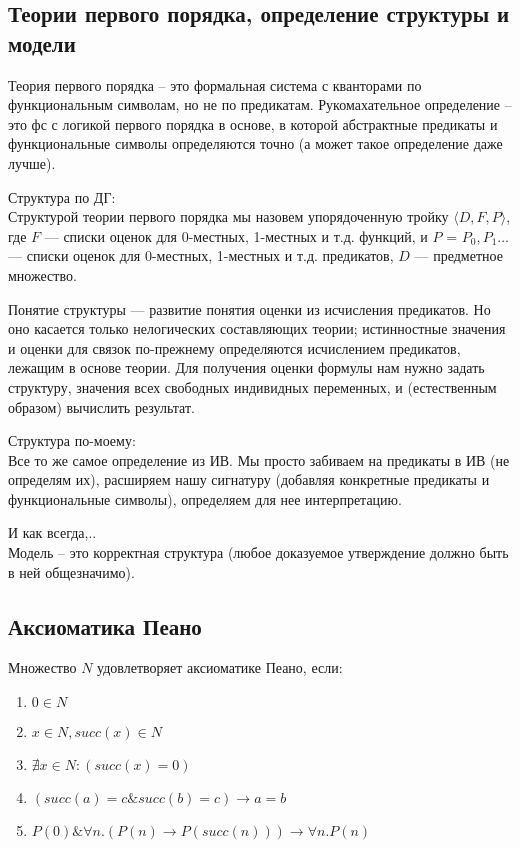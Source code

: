 \subsection{Теории первого порядка, определение структуры и модели}
\label{sec-2-18}
Теория первого порядка -- это формальная система с кванторами по
функциональным символам, но не по предикатам. Рукомахательное
определение – это фс с логикой первого порядка в основе, в которой
абстрактные предикаты и функциональные символы определяются точно
(а может такое определение даже лучше).

Структура по ДГ:\\
Структурой теории первого порядка мы назовем упорядоченную тройку
$\langle D, F, P\rangle$, где $F$ — списки оценок для 0-местных, 1-местных и т.д.
функций, и $P$ = $P_{0}, P_{1} \ldots$ — списки оценок для 0-местных,
1-местных и т.д. предикатов, $D$ — предметное множество.

Понятие структуры — развитие понятия оценки из исчисления предикатов.
Но оно касается только нелогических составляющих теории; истинностные
значения и оценки для связок по-прежнему определяются исчислением
предикатов, лежащим в основе теории. Для получения оценки формулы
нам нужно задать структуру, значения всех свободных индивидных
переменных, и (естественным образом) вычислить результат.

Структура по-моему:\\
Все то же самое определение из ИВ. Мы просто забиваем на предикаты
в ИВ (не определям их), расширяем нашу сигнатуру (добавляя конкретные
предикаты и функциональные символы), определяем для нее интерпретацию.

И как всегда,..\\
Модель – это корректная структура (любое доказуемое утверждение должно
быть в ней общезначимо).
\subsection{Аксиоматика Пеано}
\label{sec-2-19}
Множество $N$ удовлетворяет аксиоматике Пеано, если:
\begin{enumerate}
\item $0 \in N$
\item $x \in N, succ(x) \in N$
\item $\nexists x \in N : (succ(x) = 0)$
\item $(succ(a) = c \& succ(b) = c) \to a = b$
\item $P(0) \& \forall n.(P(n) \to P(succ(n))) \to \forall n.P(n)$
\end{enumerate}
